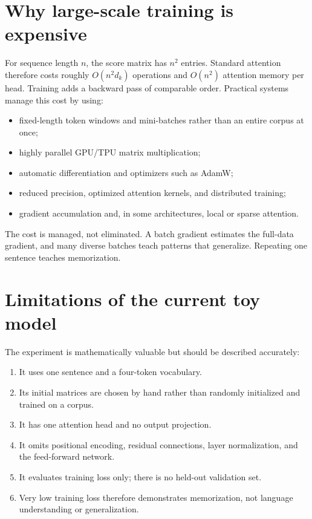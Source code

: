 \documentclass[11pt]{article}
\begin{document}
\section{Why large-scale training is expensive}

For sequence length $n$, the score matrix has $n^2$ entries. Standard attention therefore costs roughly
$O(n^2d_k)$ operations and $O(n^2)$ attention memory per head. Training adds a backward pass of comparable
order. Practical systems manage this cost by using:
\begin{itemize}
  \item fixed-length token windows and mini-batches rather than an entire corpus at once;
  \item highly parallel GPU/TPU matrix multiplication;
  \item automatic differentiation and optimizers such as AdamW;
  \item reduced precision, optimized attention kernels, and distributed training;
  \item gradient accumulation and, in some architectures, local or sparse attention.
\end{itemize}
The cost is managed, not eliminated. A batch gradient estimates the full-data gradient, and many diverse
batches teach patterns that generalize. Repeating one sentence teaches memorization.

\section{Limitations of the current toy model}

The experiment is mathematically valuable but should be described accurately:
\begin{enumerate}
  \item It uses one sentence and a four-token vocabulary.
  \item Its initial matrices are chosen by hand rather than randomly initialized and trained on a corpus.
  \item It has one attention head and no output projection.
  \item It omits positional encoding, residual connections, layer normalization, and the feed-forward network.
  \item It evaluates training loss only; there is no held-out validation set.
  \item Very low training loss therefore demonstrates memorization, not language understanding or generalization.
\end{enumerate}
\end{document}

